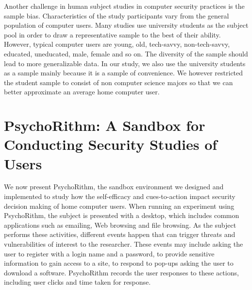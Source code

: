 Another challenge in human subject studies in computer security practices is the sample bias. Characteristics of the study participants vary from the general population of computer users.  Many studies use university students as the subject pool \cite{sotirakopoulos2011, warkentin2016} in order to draw a representative sample to the best of their ability. However, typical computer users are young, old, tech-savvy, non-tech-savvy, educated, uneducated, male, female and so on. The diversity of the sample should lead to more generalizable data. In our study, we also use the university students as a sample mainly because it is a sample of convenience. We however restricted the student sample to consist of non computer science majors so that we can better approximate an average home computer user.



\section{PsychoRithm: A Sandbox for Conducting Security Studies of Users}
We now present PsychoRithm, the sandbox environment we designed and implemented to study how the self-efficacy and cues-to-action impact security decision making of home computer users.
When running an experiment using PsychoRithm, the subject is presented with a desktop, which includes common applications such as emailing, Web browsing and file browsing. As the subject performs these activities, different events happen that can trigger threats and vulnerabilities of interest to the researcher. These events may include asking the user to register with a login name and a password, to provide sensitive information to gain access to a site, to respond to pop-ups asking the user to download a software. PsychoRithm records the user responses to these actions, including user clicks and time taken for response.

